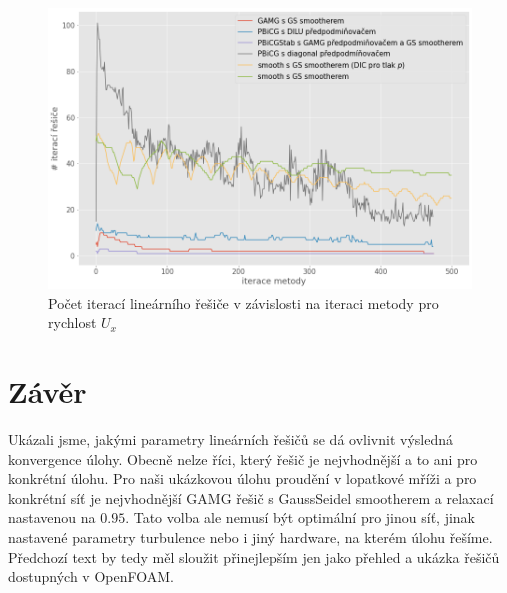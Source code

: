 \documentclass[a4paper,12pt]{report}
\theoremstyle{remark}
\begin{document}
\begin{figure}[H]
	\centering
	\includegraphics[width=1\linewidth]{ux-solver-iters.png}
	\caption{Počet iterací lineárního řešiče v závislosti na iteraci metody pro rychlost $U_x$}
	\label{fig:ux-iters}
\end{figure}



{\let\clearpage\relax \chapter{Závěr}}

Ukázali jsme, jakými parametry lineárních řešičů se dá ovlivnit výsledná konvergence úlohy. Obecně nelze říci, který řešič je nejvhodnější a to ani pro konkrétní úlohu. Pro naši ukázkovou úlohu proudění v lopatkové mříži a pro konkrétní síť je nejvhodnější GAMG řešič s GaussSeidel smootherem a relaxací nastavenou na $0.95$. Tato volba ale nemusí být optimální pro jinou síť, jinak nastavené parametry turbulence nebo i jiný hardware, na kterém úlohu řešíme. Předchozí text by tedy měl sloužit přinejlepším jen jako přehled a ukázka řešičů dostupných v OpenFOAM.
\end{document}
